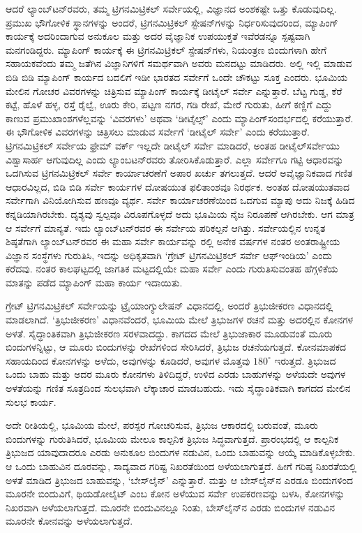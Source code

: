 ಆದರೆ ಲ್ಯಾಂಬ್​ಟನ್​ರವರು, ತಮ್ಮ ಟ್ರಿಗನಮಿಟ್ರಿಕಲ್​ ಸರ್ವೇಯಲ್ಲಿ, ವಿಜ್ಞಾನದ ಅಂಶಕಷ್ಟೇ ಒತ್ತು ಕೊಡುವುದಿಲ್ಲ. ಪ್ರಮುಖ ಭೌಗೋಳಿಕ ಸ್ಥಾನಗಳನ್ನು ಅಂದರೆ, ಟ್ರಿಗನಮಿಟ್ರಿಕಲ್​ ಸ್ಟೇಷನ್​ಗಳನ್ನು ನಿರ್ಧರಿಸುವುದರಿಂದ, ಮ್ಯಾಪಿಂಗ್​ ಕಾರ್ಯಕ್ಕೆ ಅದರಿಂದಾಗುವ ಅನುಕೂಲ ಮತ್ತು ಅದರ ವೈಜ್ಞಾನಿಕ ಉಪಯುಕ್ತತೆ ಇವೆರಡನ್ನೂ ಸ್ಪಷ್ಟವಾಗಿ ಮನಗಂಡಿದ್ದರು. ಮ್ಯಾಪಿಂಗ್​ ಕಾರ್ಯಕ್ಕೆ ಈ ಟ್ರಿಗನಮಿಟ್ರಿಕಲ್​ ಸ್ಟೇಷನ್​ಗಳು, ನಿಯಂತ್ರಣ ಬಿಂದುಗಳಾಗಿ ಹೇಗೆ ಸಹಾಯಕವೆಂದು ತಮ್ಮ ಜತೆಗಿನ ವಿಜ್ಞಾನಿಗಳಿಗೆ ಸಮರ್ಥವಾಗಿ ಅವರು ಮನದಟ್ಟು ಮಾಡಿದರು. ಅಲ್ಲಿ ಇಲ್ಲಿ ಮಾಡುವ ಬಿಡಿ ಬಿಡಿ ಮ್ಯಾಪಿಂಗ್​ ಕಾರ್ಯದ ಬದಲಿಗೆ ಇಡೀ ಭಾರತದ ಸರ್ವೇಗೆ ಒಂದೇ ಚೌಕಟ್ಟು ಸೂಕ್ತ ಎಂದರು. ಭೂಮಿಯ ಮೇಲಿನ ಗೋಚರ ವಿವರಗಳನ್ನು ಚಿತ್ರಿಸುವ ಮ್ಯಾಪಿಂಗ್​ ಕಾರ್ಯಕ್ಕೆ ಡೀಟೈಲ್​ ಸರ್ವೇ ಎನ್ನುತ್ತಾರೆ. ಬೆಟ್ಟ ಗುಡ್ಡ, ಕೆರೆ ಕಟ್ಟೆ, ಹೊಳೆ ಹಳ್ಳ, ರಸ್ತೆ ರೈಲ್ವೆ, ಊರು ಕೇರಿ, ಪಟ್ಟಣ ನಗರ, ಗಡಿ ರೇಖೆ, ಮೇರೆ ಗುರುತು, ಹೀಗೆ ಕಣ್ಣಿಗೆ ಎದ್ದು ಕಾಣುವ ಪ್ರಮುಖಾಂಶಗಳೆಲ್ಲವನ್ನು ‘ವಿವರಗಳು’ ಅಥವಾ ‘ಡೀಟೈಲ್ಸ್’ ಎಂದು ಮ್ಯಾಪಿಂಗ್​ ಸಂದರ್ಭದಲ್ಲಿ ಕರೆಯುತ್ತಾರೆ. ಈ ಭೌಗೋಳಿಕ ವಿವರಗಳನ್ನು ಚಿತ್ರಿಸಲು ಮಾಡುವ ಸರ್ವೇಗೆ ‘ಡೀಟೈಲ್​ ಸರ್ವೇ’ ಎಂದು ಕರೆಯುತ್ತಾರೆ. ಟ್ರಿಗನಮಿಟ್ರಿಕಲ್​ ಸರ್ವೇಯ ಫ್ರೇಮ್ ವರ್ಕ್ ಇಲ್ಲದೇ ಡೀಟೈಲ್​ ಸರ್ವೇ ಮಾಡಿದರೆ, ಅಂತಹ ಡೀಟೈಲ್​ ಸರ್ವೇಯು ವಿಶ್ವಾಸಾರ್ಹ ಆಗುವುದಿಲ್ಲ ಎಂದು ಲ್ಯಾಂಬಟನ್​ರವರು ತೋರಿಸಿಕೊಡುತ್ತಾರೆ. ಎಲ್ಲಾ ಸರ್ವೇಗೂ ಗಟ್ಟಿ ಆಧಾರವನ್ನು ಒದಗಿಸುವ ಟ್ರಿಗನಮಿಟ್ರಿಕಲ್​ ಸರ್ವೇ ಕಾರ್ಯಾಚರಣೆಗೆ ಅಪಾರ ಖರ್ಚು ತಗಲುತ್ತದೆ. ಆದರೆ ಅವೈಜ್ಞಾನಿಕವಾದ ಗಣಿತ ಆಧಾರವಿಲ್ಲದ, ಬಿಡಿ ಬಿಡಿ ಸರ್ವೇ ಕಾರ್ಯಗಳ ದೋಷಯುತ ಫಲಿತಾಂಶವೂ ನಿರರ್ಥಕ. ಅಂತಹ ದೋಷಯುತವಾದ ಸರ್ವೇಗಾಗಿ ವಿನಿಯೋಗಿಸುವ ಹಣವೂ ವ್ಯರ್ಥ. ಸರ್ವೇ ಕಾರ್ಯಾಚರಣೆಯಿಂದ ಒದಗುವ ಮ್ಯಾಪು ಅದು ನಿಜಕ್ಕೆ ಹಿಡಿದ ಕನ್ನಡಿಯಾಗಿರಬೇಕು. ದೃಶ್ಯವು ಸ್ವಲ್ಪವೂ ವಿರೂಪಗೊಳ್ಳದೆ ಅದು ಭೂಮಿಯ ನೈಜ ನಿರೂಪಣೆ ಆಗಿರಬೇಕು. ಆಗ ಮಾತ್ರ ಆ ಸರ್ವೇಗೆ ಮಾನ್ಯತೆ. ಇದು ಲ್ಯಾಂಬ್​ಟನ್​ರವರ ಈ ಸರ್ವೇಯ ಪರಿಕಲ್ಪನೆ ಆಗಿತ್ತು. ಸರ್ವೇಯಲ್ಲಿನ ಉನ್ನತ ಶಿಷ್ಠತೆಗಾಗಿ ಲ್ಯಾಂಬ್​ಟನ್​ರವರ ಈ ಮಹಾ ಸರ್ವೇ ಕಾರ್ಯವನ್ನು ರಲ್ಲಿ ಅನೇಕ ವರ್ಷಗಳ ನಂತರ ಅಂತರಾಷ್ಟ್ರೀಯ ವಿಜ್ಞಾನ ಸಂಸ್ಥೆಗಳು ಗುರುತಿಸಿ, ಇದನ್ನು ಅಧಿಕೃತವಾಗಿ ‘ಗ್ರೇಟ್​ ಟ್ರಿಗನಮಿಟ್ರಿಕಲ್​ ಸರ್ವೇ ಆಫ್​ ಇಂಡಿಯ’ ಎಂದು ಕರೆದವು. ನಂತರ ಕಾಲಘಟ್ಟದಲ್ಲಿ ಜಾಗತಿಕ ಮಟ್ಟದಲ್ಲಿಯೇ ಮಹಾ ಸರ್ವೇ ಎಂದು ಗುರುತಿಸುವಂತಹ ಹೆಗ್ಗಳಿಕೆಯ ಮಾತನ್ನು ಪಡೆದ ಮ್ಯಾಪಿಂಗ್​ ಮಹಾ ಕಾರ್ಯ ಇದಾಯಿತು.

ಗ್ರೇಟ್​ ಟ್ರಿಗನಮಿಟ್ರಿಕಲ್​ ಸರ್ವೇಯನ್ನು ಟ್ರೈಯಾಂಗ್ಯುಲೇಷನ್​ ವಿಧಾನದಲ್ಲಿ, ಅಂದರೆ ತ್ರಿಭುಜೀಕರಣ ವಿಧಾನದಲ್ಲಿ ಮಾಡಲಾಗಿದೆ. ‘ತ್ರಿಭುಜೀಕರಣ’ ವಿಧಾನವೆಂದರೆ, ಭೂಮಿಯ ಮೇಲೆ ತ್ರಿಭುಜಗಳ ರಚನೆ ಮತ್ತು ಅದರಲ್ಲಿನ ಕೋನಗಳ ಅಳತೆ. ಸೈದ್ಧಾಂತಿಕವಾಗಿ ತ್ರಿಭುಜೀಕರಣ ಸರಳವಾದದ್ದು. ಕಾಗದದ ಮೇಲೆ ತ್ರಿಭುಜಾಕಾರ ಮೂಡುವಂತೆ ಮೂರು ಬಿಂದುಗಳನ್ನಿಟ್ಟು, ಆ ಮೂರು ಬಿಂದುಗಳನ್ನು ರೇಖೆಗಳಿಂದ ಸೇರಿಸಿದರೆ, ತ್ರಿಭುಜ ರಚನೆಯಗುತ್ತದೆ. ಕೋನಮಾಪಕದ ಸಹಾಯದಿಂದ ಕೋನಗಳನ್ನು ಅಳೆದು, ಅವುಗಳನ್ನು ಕೂಡಿದರೆ, ಅವುಗಳ ಮೊತ್ತವು $180^\circ$ ಇರುತ್ತದೆ. ತ್ರಿಭುಜದ ಒಂದು ಬಾಹು ಮತ್ತು ಅದರ ಮೂರು ಕೋನಗಳು ತಿಳಿದಿದ್ದರೆ, ಉಳಿದ ಎರಡು ಬಾಹುಗಳನ್ನು ಅಳೆಯದೇ ಅವುಗಳ ಅಳತೆಯನ್ನು ಗಣಿತ ಸೂತ್ರದಿಂದ ಸುಲಭವಾಗಿ ಲೆಕ್ಕಾಚಾರ ಮಾಡಬಹುದು. ಇದು ಸೈದ್ಧಾಂತಿಕವಾಗಿ ಕಾಗದದ ಮೇಲಿನ ಸುಲಭ ಕಾರ್ಯ.

ಅದೇ ರೀತಿಯಲ್ಲಿ, ಭೂಮಿಯ ಮೇಲೆ, ಪರಸ್ಪರ ಗೋಚರಿಸುವ, ತ್ರಿಭುಜ ಆಕಾರದಲ್ಲಿ ಬರುವಂತೆ, ಮೂರು ಬಿಂದುಗಳನ್ನು ಗುರುತಿಸಿದರೆ, ಭೂಮಿಯ ಮೇಲೂ ಕಾಲ್ಪನಿಕ ತ್ರಿಭುಜ ಸಿದ್ಧವಾಗುತ್ತದೆ. ಪ್ರಾರಂಭದಲ್ಲಿ ಆ ಕಾಲ್ಪನಿಕ ತ್ರಿಭುಜದ ಯಾವುದಾದರೂ ಎರಡು ಅನುಕೂಲ ಬಿಂದುಗಳ ನಡುವಿನ, ಒಂದು ಬಾಹುವನ್ನು ಆಯ್ಕೆ ಮಾಡಿಕೊಳ್ಳಬೇಕು. ಆ ಒಂದು ಬಾಹುವಿನ ದೂರವನ್ನು, ಸಾದ್ಯವಾದ ಗರಿಷ್ಟ ನಿಖರತೆಯಿಂದ ಅಳೆಯಲಾಗುತ್ತದೆ. ಹೀಗೆ ಗರಿಷ್ಠ ನಿಖರತೆಯಲ್ಲಿ ಅಳತೆ ಮಾಡಿದ ತ್ರಿಭುಜದ ಬಾಹುವನ್ನು, ‘ಬೇಸ್‌ಲೈನ್​’ ಎನ್ನುತ್ತಾರೆ. ಮತ್ತು ಆ ಬೇಸ್‌ಲೈನ್​ನ ಎರಡೂ ಬಿಂದುಗಳಿಂದ ಮೂರನೇ ಬಿಂದುವಿಗೆ, ಥಿಯಡೋಲೈಟ್​ ಎಂಬ ಕೋನ ಅಳೆಯುವ ಸರ್ವೇ ಉಪಕರಣವನ್ನು ಬಳಸಿ, ಕೋನಗಳನ್ನು ನಿಖರವಾಗಿ ಅಳೆಯಲಾಗುತ್ತದೆ. ಮೂರನೇ ಬಿಂದುವಿನಲ್ಲೂ ನಿಂತು, ಬೇಸ್‌ಲೈನ್​ನ ಎರಡು ಬಿಂದುಗಳ ನಡುವಿನ ಮೂರನೇ ಕೋನವನ್ನು ಅಳೆಯಲಾಗುತ್ತದೆ.

